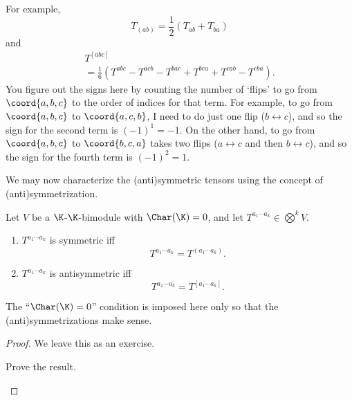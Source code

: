 \begin{exm}{}{}
	For example,
	\begin{equation}
		T_{(ab)}=\frac{1}{2}(T_{ab}+T_{ba})
	\end{equation}
	and
	\begin{equation}
		\begin{multlined}
			T^{[abc]} \\ =\frac{1}{6}(T^{abc}-T^{acb}-T^{bac}+T^{bca}+T^{cab}-T^{cba}).
		\end{multlined}
	\end{equation}
	You figure out the signs here by counting the number of `flips' to go from $\coord{a,b,c}$ to the order of indices for that term.  For example, to go from $\coord{a,b,c}$ to $\coord{a,c,b}$, I need to do just one flip ($b\leftrightarrow c$), and so the sign for the second term is $(-1)^1=-1$.  On the other hand, to go from $\coord{a,b,c}$ to $\coord{b,c,a}$ takes two flips ($a\leftrightarrow c$ and then $b\leftrightarrow c$), and so the sign for the fourth term is $(-1)^2=1$.
\end{exm}
We may now characterize the (anti)symmetric tensors using the concept of (anti)symmetrization.
\begin{prp}{}{}
	Let $V$ be a $\K$-$\K$-bimodule with $\Char (\K )=0$, and let $T^{a_1\cdots a_k}\in \bigotimes ^kV$.
	\begin{enumerate}
		\item $T^{a_1\cdots a_k}$ is symmetric iff
		\begin{equation}
			T^{a_1\cdots a_k}=T^{(a_1\cdots a_k)}.
		\end{equation}
		\item $T^{a_1\cdots a_k}$ is antisymmetric iff
		\begin{equation}
			T^{a_1\cdots a_k}=T^{[a_1\cdots a_k]}.
		\end{equation}
	\end{enumerate}
	\begin{rmk}
		The ``$\Char (\K )=0$'' condition is imposed here only so that the (anti)symmetrizations make sense.
	\end{rmk}
	\begin{proof}
		We leave this as an exercise.
		\begin{exr}[breakable=false]{}{}
			Prove the result.
		\end{exr}
	\end{proof}
\end{prp}
